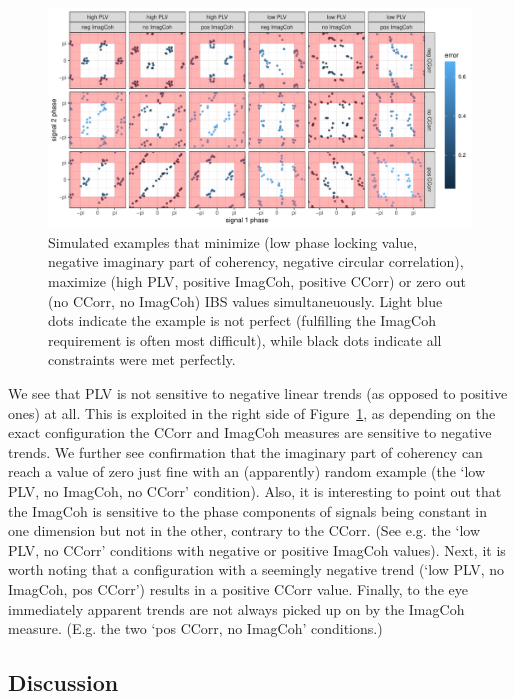 \begin{landscape}
  \begin{figure}
    \includegraphics[width=\linewidth]{../stats/results/simulation_local_search.pdf}
    \caption{Simulated examples that minimize (low phase locking value, negative imaginary part of coherency, negative circular correlation), maximize (high PLV, positive ImagCoh, positive CCorr) or zero out (no CCorr, no ImagCoh) IBS values simultaneuously. Light blue dots indicate the example is not perfect (fulfilling the ImagCoh requirement is often most difficult), while black dots indicate all constraints were met perfectly.}
    \label{fig:simulation_local_search}
  \end{figure}
\end{landscape}

We see that PLV is not sensitive to negative linear trends (as opposed to
positive ones) at all. This is exploited in the right side of
Figure~\ref{fig:simulation_local_search}, as depending on the exact
configuration the CCorr and ImagCoh measures
are sensitive to negative trends. We further see confirmation that the imaginary
part of coherency can reach a value of zero just fine with an (apparently)
random example (the `low PLV, no ImagCoh, no CCorr' condition). Also, it is
interesting to point out that the ImagCoh is sensitive to
the phase components of signals being constant in one dimension but not in the
other, contrary to the CCorr. (See e.g. the `low PLV, no CCorr'
conditions with negative or positive ImagCoh values).
Next, it is worth noting that a configuration with a seemingly negative trend
(`low PLV, no ImagCoh, pos CCorr') results in a positive CCorr
value. Finally, to the eye immediately apparent trends are not always picked up
on by the ImagCoh measure. (E.g. the two `pos CCorr, no ImagCoh' conditions.)

\subsection{Discussion}

